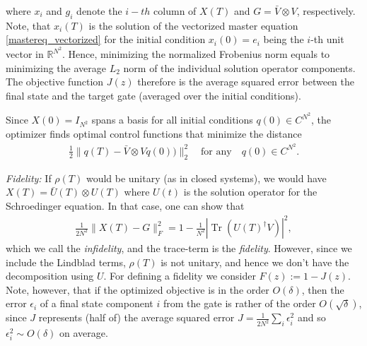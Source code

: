 \documentclass[letterpaper]{article}
\DeclareMathOperator{\Tr}{Tr}
\newcommand{\R}{\mathds{R}}
\newcommand{\C}{\mathds{C}}
\begin{document}
where $x_i$ and $g_i$ denote the $i-th$ column of $X(T)$ and $G=\bar V\otimes V$, respectively. Note, that $x_i(T)$ is the solution of the vectorized master equation \eqref{mastereq_vectorized} for the initial condition $x_i(0) = e_i$ being the $i$-th unit vector in $\R^{N^2}$. Hence, minimizing the normalized Frobenius norm equals to minimizing the average $L_2$ norm of the individual solution operator components. The objective function $J(z)$ therefore is the average squared error between the final state and the target gate (averaged over the initial conditions). 

Since $X(0) = I_{N^2}$ spans a basis for all initial conditions $q(0) \in C^{N^2}$, the optimizer finds optimal control functions that minimize the distance 
\begin{align}
       \frac{1}{2} \| q(T) - \bar V\otimes V q(0)) \|^2_2 \quad \text{for any} \quad q(0) \in C^{N^2}.
\end{align}
 
\textit{Fidelity:} If $\rho(T)$ would be unitary (as in closed systems), we would have $X(T) = \bar U(T) \otimes U(T)$ where $U(t)$ is the solution operator for the Schroedinger equation. In that case, one can show that 
\begin{align}
  \frac{1}{2N^2}\|X(T) - G\|_F^2 = 1 - \frac{1}{N^2}|\Tr(U(T)^{\dagger}V)|^2,
\end{align}
which we call the \textit{infidelity}, and the trace-term is the \textit{fidelity}. However, since we include the Lindblad terms, $\rho(T)$ is not unitary, and hence we don't have the decomposition using $U$. For defining a fidelity we consider $F(z) := 1 - J(z)$. Note, however, that if the optimized objective is in the order $O(\delta)$, then the error $\epsilon_i$ of a final state component $i$ from the gate is rather of the order $O(\sqrt{\delta})$, since $J$ represents (half of) the average squared error $J = \frac{1}{2N^2}\sum_i \epsilon_i^2$ and so $\epsilon_i^2 \sim O(\delta)$ on average.

\end{document}

